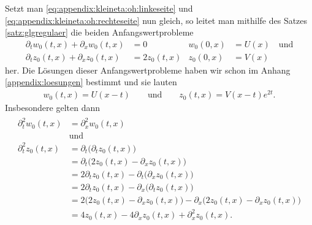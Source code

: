 
Setzt man \eqref{eq:appendix:kleineta:oh:linkeseite} und \eqref{eq:appendix:kleineta:oh:rechteseite} nun gleich, so leitet man mithilfe des Satzes \ref{satz:glgregulaer} die beiden Anfangswertprobleme
\begin{align}\label{eq:appendix:kleineta:oh}
\partial_t w_0(t,x) + \partial_x w_0(t,x) &= 0 &w_0(0,x) &= U(x) \quad \text{und}\\
\partial_t z_0(t,x) + \partial_x z_0(t,x) &= 2 z_0(t,x)  &z_0(0,x) &= V(x) 
\end{align}
her. Die Lösungen dieser Anfangswertprobleme haben wir schon im Anhang \ref{appendix:loesungen} bestimmt und sie lauten
\begin{align}
w_0(t,x) = U(x - t) \qquad \text{und} \qquad z_0(t,x) = V(x - t) e^{2 t}.
\end{align}
Insbesondere gelten dann
\begin{align}\label{eq:appendix:kleineta:korollar:h2}
\begin{split}
\partial^2_t w_0(t,x) &= \partial^2_x w_0(t,x)\qquad\\&\text{und}\\
\partial^2_t z_0(t,x) &= \partial_t \bigl( \partial_t z_0(t,x) \bigr)\\
&= \partial_t \bigl( 2z_0(t,x)  - \partial_x z_0(t,x) \bigr)\\
&= 2 \partial_t z_0(t,x) - \partial_t \bigl( \partial_x z_0(t,x) \bigr)\\
&= 2 \partial_t z_0(t,x) - \partial_x \bigl( \partial_t z_0(t,x) \bigr)\\
&= 2 \bigl( 2z_0(t,x) - \partial_x z_0(t,x) \bigr) - \partial_x \bigl( 2 z_0(t,x) - \partial_x z_0(t,x) \bigr)\\
&= 4 z_0(t,x) - 4 \partial_x z_0(t,x) + \partial^2_x z_0(t,x).
\end{split}
\end{align}

